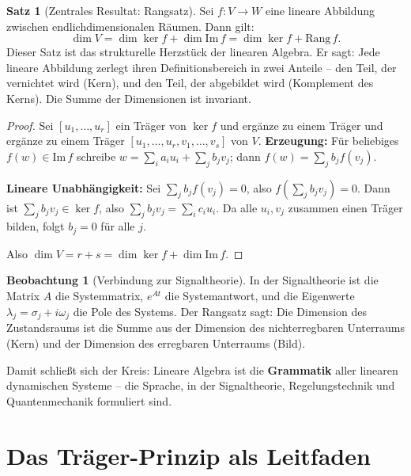 ﻿\documentclass[a4paper,12pt]{report}
\theoremstyle{definition}
\newtheorem{satz}{Satz}
\newtheorem{beobachtung}{Beobachtung}
\begin{document}
\begin{satz}[Zentrales Resultat: Rangsatz]
    Sei $f : V \to W$ eine lineare Abbildung zwischen endlichdimensionalen
    Räumen. Dann gilt:
    \[
        \dim V = \dim \ker f + \dim \mathrm{Im}\, f = \dim \ker f + \mathrm{Rang}\, f.
    \]
    Dieser Satz ist das strukturelle Herzstück der linearen Algebra. Er
    sagt: Jede lineare Abbildung zerlegt ihren Definitionsbereich in zwei
    Anteile -- den Teil, der vernichtet wird (Kern), und den Teil, der
    abgebildet wird (Komplement des Kerns). Die Summe der Dimensionen
    ist invariant.
\end{satz}
\begin{proof}
    Sei $[u_1, \ldots, u_r]$ ein Träger von $\ker f$
    und ergänze zu einem Träger
    und ergänze zu einem Träger $[u_1, \ldots, u_r,
    v_1, \ldots, v_s]$ von $V$.
    \textbf{Erzeugung:} Für beliebiges $f(w) \in \mathrm{Im}\, f$ schreibe
    $w = \sum_i a_i u_i + \sum_j b_j v_j$; dann $f(w) = \sum_j b_j f(v_j)$.

    \textbf{Lineare Unabhängigkeit:} Sei $\sum_j b_j f(v_j) = 0$, also
    $f(\sum_j b_j v_j) = 0$. Dann ist $\sum_j b_j v_j \in \ker f$,
    also $\sum_j b_j v_j = \sum_i c_i u_i$. Da alle $u_i, v_j$ zusammen
    einen Träger bilden, folgt $b_j = 0$ für alle $j$.

    Also $\dim V = r + s = \dim \ker f + \dim \mathrm{Im}\, f$.
\end{proof}


\begin{beobachtung}[Verbindung zur Signaltheorie]
    In der Signaltheorie ist die Matrix $A$ die Systemmatrix, $e^{At}$
    die Systemantwort, und die Eigenwerte $\lambda_j = \sigma_j + i\omega_j$
    die Pole des Systems. Der Rangsatz sagt: Die Dimension des Zustandsraums
    ist die Summe aus der Dimension des nichterregbaren Unterraums (Kern) und
    der Dimension des erregbaren Unterraums (Bild).

    Damit schließt sich der Kreis: Lineare Algebra ist die
    \textbf{Grammatik} aller linearen dynamischen Systeme -- die Sprache,
    in der Signaltheorie, Regelungstechnik und Quantenmechanik formuliert sind.
\end{beobachtung}



\section{Das Träger-Prinzip als Leitfaden}
\end{document}
